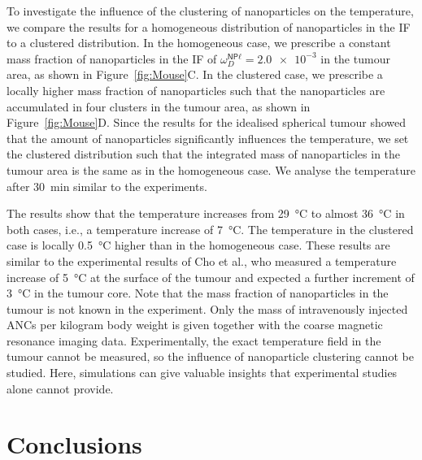 \documentclass[Times1COL,AMA]{WileyNJDv5} %
\newcommand{\omegaNPlD}{\omega^{\textsf{NP}\ell}_D}
\begin{document}
To investigate the influence of the clustering of nanoparticles on the temperature, we compare the results for a homogeneous distribution of nanoparticles in the IF to a clustered distribution.
In the homogeneous case, we prescribe a constant mass fraction of nanoparticles in the IF of $\omegaNPlD = \num{2.0e-3}$ in the tumour area, as shown in Figure~\ref{fig:Mouse}C.
In the clustered case, we prescribe a locally higher mass fraction of nanoparticles such that the nanoparticles are accumulated in four clusters in the tumour area, as shown in Figure~\ref{fig:Mouse}D.
Since the results for the idealised spherical tumour showed that the amount of nanoparticles significantly influences the temperature, we set the clustered distribution such that the integrated mass of nanoparticles in the tumour area is the same as in the homogeneous case.
We analyse the temperature after \SI{30}{\minute} similar to the experiments.

The results show that the temperature increases from \SI{29}{\celsius} to almost \SI{36}{\celsius} in both cases, i.e., a temperature increase of \SI{7}{\celsius}.
The temperature in the clustered case is locally \SI{0.5}{\celsius} higher than in the homogeneous case.
These results are similar to the experimental results of Cho et al., \cite{Cho2017} who measured a temperature increase of \SI{5}{\celsius} at the surface of the tumour and expected a further increment of \SI{3}{\celsius} in the tumour core.
Note that the mass fraction of nanoparticles in the tumour is not known in the experiment.
Only the mass of intravenously injected ANCs per kilogram body weight is given together with the coarse magnetic resonance imaging data.
Experimentally, the exact temperature field in the tumour cannot be measured, so the influence of nanoparticle clustering cannot be studied.
Here, simulations can give valuable insights that experimental studies alone cannot provide.

\section{Conclusions}\label{sec4}
\end{document}
